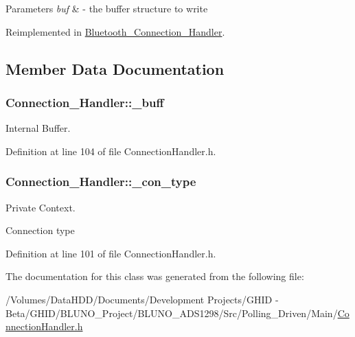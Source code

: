 \begin{DoxyParams}{\-Parameters}
{\em buf} & -\/ the buffer structure to write \\
\hline
\end{DoxyParams}


\-Reimplemented in \hyperlink{class_bluetooth___connection___handler_afb57232b5a23ddc1be523b9fe6b275b5}{\-Bluetooth\-\_\-\-Connection\-\_\-\-Handler}.



\subsection{\-Member \-Data \-Documentation}
\hypertarget{class_connection___handler_ad1eca58f0f8cb43147ce961389293b37}{
\subsubsection[{\-\_\-buff}]{ {\bf \-Connection\-\_\-\-Handler\-::\-\_\-buff}}}\label{class_connection___handler_ad1eca58f0f8cb43147ce961389293b37}


\-Internal \-Buffer. 



\-Definition at line 104 of file \-Connection\-Handler.\-h.

\hypertarget{class_connection___handler_a3ac7a0346fb72ae55ffa867465e397f2}{
\subsubsection[{\-\_\-con\-\_\-type}]{ {\bf \-Connection\-\_\-\-Handler\-::\-\_\-con\-\_\-type}}}\label{class_connection___handler_a3ac7a0346fb72ae55ffa867465e397f2}


\-Private \-Context. 

\-Connection type 

\-Definition at line 101 of file \-Connection\-Handler.\-h.



\-The documentation for this class was generated from the following file\-:\begin{DoxyCompactItemize}
\item 
/\-Volumes/\-Data\-H\-D\-D/\-Documents/\-Development Projects/\-G\-H\-I\-D -\/ Beta/\-G\-H\-I\-D/\-B\-L\-U\-N\-O\-\_\-\-Project/\-B\-L\-U\-N\-O\-\_\-\-A\-D\-S1298/\-Src/\-Polling\-\_\-\-Driven/\-Main/\hyperlink{_connection_handler_8h}{\-Connection\-Handler.\-h}\end{DoxyCompactItemize}
